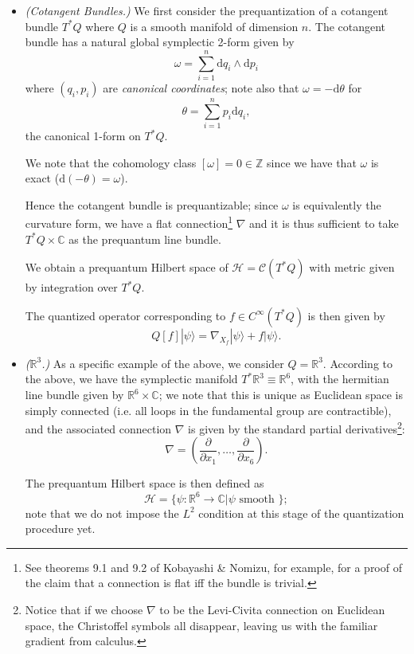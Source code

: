 \documentclass{tufte-handout}
\def\d{\mathrm{d}}
\begin{document}
\begin{itemize}
\item \emph{(Cotangent Bundles.)} We first consider the prequantization of a cotangent bundle $T^*Q$ where $Q$ is a smooth manifold of dimension $n$. The cotangent bundle has a natural global symplectic 2-form given by
$$
\omega = \sum_{i=1}^n \d q_i \wedge \d p_i
$$
where $(q_i,p_i)$ are \emph{canonical coordinates}; note also that $\omega = -\d\theta$ for
$$
\theta = \sum_{i=1}^n p_i \d q_i,
$$
the canonical 1-form on $T^*Q$.

We note that the cohomology class $[\omega] = 0 \in \mathbb{Z}$ since we have that $\omega$ is exact ($\d(-\theta) = \omega$).

Hence the cotangent bundle is prequantizable; since $\omega$ is equivalently the curvature form, we have a flat connection\footnote{See theorems 9.1 and 9.2 of Kobayashi \& Nomizu, for example, for a proof of the claim that a connection is flat iff the bundle is trivial.} $\nabla$ and it is thus sufficient to take $T^*Q \times \mathbb{C}$ as the prequantum line bundle.

We obtain a prequantum Hilbert space of $\mathcal{H} = \mathcal{C}(T^*Q)$ with metric given by integration over $T^*Q$. %

The quantized operator corresponding to $f \in C^\infty(T^*Q)$ is then given by
$$
Q[f] |\psi\rangle = \nabla_{X_f}|\psi\rangle + f|\psi\rangle.
$$

\item \emph{($\mathbb{R}^3$.)} As a specific example of the above, we consider $Q = \mathbb{R}^3$. According to the above, we have the symplectic manifold $T^*\mathbb{R}^3 \equiv \mathbb{R}^6$, with the hermitian line bundle given by $\mathbb{R}^6 \times \mathbb{C}$; we note that this is unique as Euclidean space is simply connected (i.e. all loops in the fundamental group are contractible), and the associated connection $\nabla$ is given by the standard partial derivatives\footnote{Notice that if we choose $\nabla$ to be the Levi-Civita connection on Euclidean space, the Christoffel symbols all disappear, leaving us with the familiar gradient from calculus.}: %
$$
\nabla = (\frac{\partial}{\partial x_1},\ldots,\frac{\partial}{\partial x_6}).
$$

The prequantum Hilbert space is then defined as
$$
\mathcal{H} = \{\psi : \mathbb{R}^6 \to \mathbb{C} | \psi \mbox{ smooth }\};
$$
note that we do not impose the $L^2$ condition at this stage of the quantization procedure yet.


\end{itemize}
\end{document}
